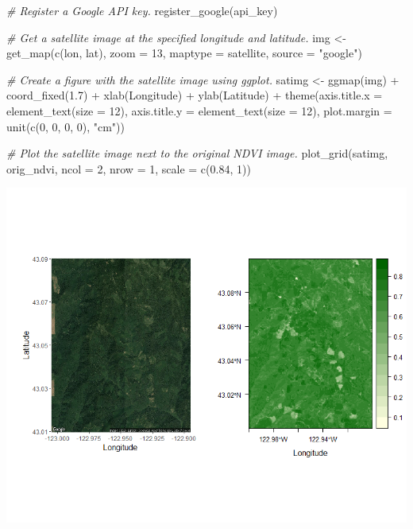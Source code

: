 \documentclass[
]{article}
\newenvironment{Shaded}{\begin{snugshade}}{\end{snugshade}}
\newcommand{\AttributeTok}[1]{\textcolor[rgb]{0.77,0.63,0.00}{#1}}
\newcommand{\CommentTok}[1]{\textcolor[rgb]{0.56,0.35,0.01}{\textit{#1}}}
\newcommand{\DecValTok}[1]{\textcolor[rgb]{0.00,0.00,0.81}{#1}}
\newcommand{\FloatTok}[1]{\textcolor[rgb]{0.00,0.00,0.81}{#1}}
\newcommand{\FunctionTok}[1]{\textcolor[rgb]{0.00,0.00,0.00}{#1}}
\newcommand{\NormalTok}[1]{#1}
\newcommand{\OtherTok}[1]{\textcolor[rgb]{0.56,0.35,0.01}{#1}}
\newcommand{\SpecialCharTok}[1]{\textcolor[rgb]{0.00,0.00,0.00}{#1}}
\newcommand{\StringTok}[1]{\textcolor[rgb]{0.31,0.60,0.02}{#1}}
\begin{document}
\begin{Shaded}
\begin{Highlighting}[]
\CommentTok{\# Register a Google API key.}
\FunctionTok{register\_google}\NormalTok{(api\_key)}

\CommentTok{\# Get a satellite image at the specified longitude and latitude.}
\NormalTok{img }\OtherTok{\textless{}{-}} \FunctionTok{get\_map}\NormalTok{(}\FunctionTok{c}\NormalTok{(lon, lat), }\AttributeTok{zoom =} \DecValTok{13}\NormalTok{, }\AttributeTok{maptype =} \StringTok{\textquotesingle{}satellite\textquotesingle{}}\NormalTok{, }
               \AttributeTok{source =} \StringTok{"google"}\NormalTok{)}

\CommentTok{\# Create a figure with the satellite image using ggplot.}
\NormalTok{satimg }\OtherTok{\textless{}{-}} \FunctionTok{ggmap}\NormalTok{(img) }\SpecialCharTok{+} \FunctionTok{coord\_fixed}\NormalTok{(}\FloatTok{1.7}\NormalTok{) }\SpecialCharTok{+} \FunctionTok{xlab}\NormalTok{(}\StringTok{\textquotesingle{}Longitude\textquotesingle{}}\NormalTok{) }\SpecialCharTok{+} 
  \FunctionTok{ylab}\NormalTok{(}\StringTok{\textquotesingle{}Latitude\textquotesingle{}}\NormalTok{) }\SpecialCharTok{+}
  \FunctionTok{theme}\NormalTok{(}\AttributeTok{axis.title.x =} \FunctionTok{element\_text}\NormalTok{(}\AttributeTok{size =} \DecValTok{12}\NormalTok{),}
        \AttributeTok{axis.title.y =} \FunctionTok{element\_text}\NormalTok{(}\AttributeTok{size =} \DecValTok{12}\NormalTok{),}
        \AttributeTok{plot.margin =} \FunctionTok{unit}\NormalTok{(}\FunctionTok{c}\NormalTok{(}\DecValTok{0}\NormalTok{, }\DecValTok{0}\NormalTok{, }\DecValTok{0}\NormalTok{, }\DecValTok{0}\NormalTok{), }\StringTok{"cm"}\NormalTok{))}

\CommentTok{\# Plot the satellite image next to the original NDVI image.}
\FunctionTok{plot\_grid}\NormalTok{(satimg, orig\_ndvi, }\AttributeTok{ncol =} \DecValTok{2}\NormalTok{, }\AttributeTok{nrow =} \DecValTok{1}\NormalTok{, }\AttributeTok{scale =} \FunctionTok{c}\NormalTok{(}\FloatTok{0.84}\NormalTok{, }\DecValTok{1}\NormalTok{))}
\end{Highlighting}
\end{Shaded}

\includegraphics[width=0.9\linewidth]{orig_ndvi_figure}
\end{document}
